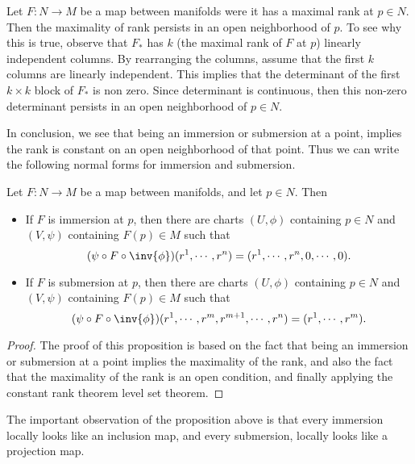 \begin{observation}
	Let $ F: N \to M $ be a map between manifolds were it has a maximal rank at $ p \in N $. Then the maximality of rank persists in an open neighborhood of $ p $. To see why this is true, observe that $ F_* $ has $ k $ (the maximal rank of $ F $ at $ p $) linearly independent columns. By rearranging the columns, assume that the first $ k $ columns are linearly independent. This implies that the determinant of the first $ k\times k $ block of $  F_* $ is non zero. Since determinant is continuous, then this non-zero determinant persists in an open neighborhood of $ p \in N $.
\end{observation}

In conclusion, we see that being an immersion or submersion at a point, implies the rank is constant on an open neighborhood of that point. Thus we can write the following normal forms for immersion and submersion.

\begin{proposition}
	Let $ F: N\to M$ be a map between manifolds, and let $ p \in N $. Then
	\begin{itemize}[noitemsep]
		\item If $ F $ is immersion at $ p $, then there are charts $ (U,\phi) $ containing $ p \in N $ and $ (V,\psi) $ containing $ F(p)\in M $ such that 
		\[ (\psi \circ F \circ \inv{\phi})(r^1,\cdots,r^n) = (r^1,\cdots,r^n,0,\cdots,0). \]
		\item If $ F $ is submersion at $ p $, then there are charts $ (U,\phi) $ containing $ p \in N $ and $ (V,\psi) $ containing $ F(p)\in M $ such that 
		\[ (\psi \circ F \circ \inv{\phi})(r^1,\cdots,r^m,r^{m+1},\cdots,r^n) = (r^1,\cdots,r^m). \]
	\end{itemize}
\end{proposition}
\begin{proof}
	The proof of this proposition is based on the fact that being an immersion or submersion at a point implies the maximality of the rank, and also the fact that the maximality of the rank is an open condition, and finally applying the constant rank theorem level set theorem.
\end{proof}

\begin{observation}
	The important observation of the proposition above is that every immersion locally looks like an inclusion map, and every submersion, locally looks like a projection map.
\end{observation}





